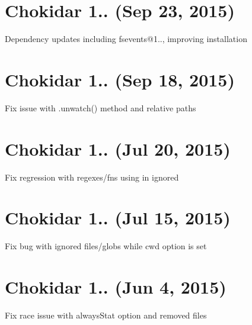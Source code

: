 \section*{Chokidar 1.. (Sep 23, 2015)}


\begin{DoxyItemize}
\item Dependency updates including fsevents@1.., improving installation
\end{DoxyItemize}

\section*{Chokidar 1.. (Sep 18, 2015)}


\begin{DoxyItemize}
\item Fix issue with {\ttfamily .unwatch()} method and relative paths
\end{DoxyItemize}

\section*{Chokidar 1.. (Jul 20, 2015)}


\begin{DoxyItemize}
\item Fix regression with regexes/fns using in {\ttfamily ignored}
\end{DoxyItemize}

\section*{Chokidar 1.. (Jul 15, 2015)}


\begin{DoxyItemize}
\item Fix bug with {\ttfamily ignored} files/globs while {\ttfamily cwd} option is set
\end{DoxyItemize}

\section*{Chokidar 1.. (Jun 4, 2015)}


\begin{DoxyItemize}
\item Fix race issue with {\ttfamily always\+Stat} option and removed files
\end{DoxyItemize}

